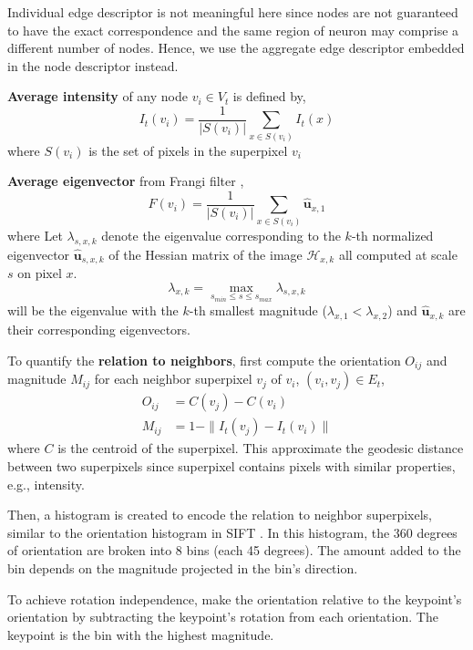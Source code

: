 \documentclass[10pt,letterpaper]{article}
\begin{document}
Individual edge descriptor is not meaningful here since nodes are not guaranteed to have the exact correspondence and the same region of neuron may comprise a different number of nodes. Hence, we use the aggregate edge descriptor embedded in the node descriptor instead.

\textbf{Average intensity} of any node $v_i \in V_t$ is defined by,
\begin{equation}
I_t(v_i) = \frac{1}{|S(v_i)|}\sum_{x \in S(v_i)} I_t(x)
\end{equation} 
where $S(v_i)$ is the set of pixels in the superpixel $v_i$

\textbf{Average eigenvector} from Frangi filter \cite{frangi1998},
\begin{equation}
F(v_i) = \frac{1}{|S(v_i)|}\sum_{x \in S(v_i)} \hat{\textbf{u}}_{x,1}
\end{equation}
where Let $\lambda_{s,x,k}$ denote the eigenvalue corresponding to the $k$-th normalized eigenvector $\hat{\textbf{u}}_{s,x,k}$
of the Hessian matrix of the image $\mathcal{H}_{x,k}$ all computed at scale $s$ on pixel $x$. 
\begin{equation}
\lambda_{x,k} = \max_{s_{min} \le s \le s_{max}} \lambda_{s,x,k}
\end{equation}
will be the eigenvalue with the $k$-th smallest magnitude ($\lambda_{x,1} < \lambda_{x,2}$) and $\hat{\textbf{u}}_{x,k}$ are their corresponding eigenvectors.

To quantify the \textbf{relation to neighbors}, first compute the orientation $O_{ij}$ and magnitude $M_{ij}$ for each neighbor superpixel $v_j$ of $v_i$, $(v_i, v_j) \in E_t$,
\begin{equation}
\begin{aligned}
O_{ij} & = C(v_j) - C(v_i) \\
M_{ij} & = 1 - \| I_t(v_j) - I_t(v_i) \|
\end{aligned}
\end{equation}
where $C$ is the centroid of the superpixel. This approximate the geodesic distance between two superpixels since superpixel contains pixels with similar properties, e.g., intensity.

Then, a histogram is created to encode the relation to neighbor superpixels, similar to the orientation histogram in SIFT \cite{lowe1999}. In this histogram, the 360 degrees of orientation are broken into 8 bins (each 45 degrees). The amount added to the bin depends on the magnitude projected in the bin's direction.

To achieve rotation independence, make the orientation relative to the keypoint's orientation by subtracting the keypoint's rotation from each orientation. The keypoint is the bin with the highest magnitude.
\end{document}
